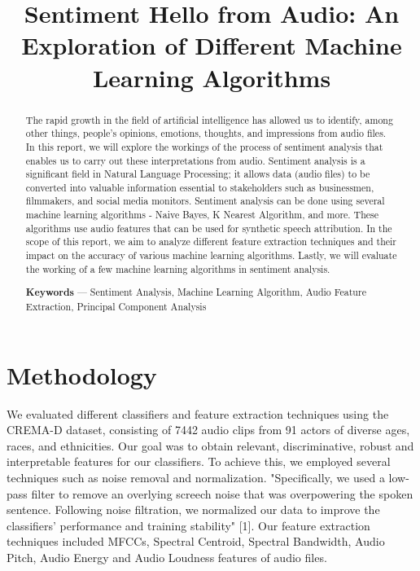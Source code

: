 \documentclass[conference]{IEEEtran}
\begin{document}
\title{Sentiment Hello from Audio: An Exploration of Different Machine Learning Algorithms}
\author{
}
\maketitle

\begin{abstract}
The rapid growth in the field of artificial intelligence has allowed us to identify, among other things, people’s opinions, emotions, thoughts, and impressions from audio files. In this report, we will explore the workings of the process of sentiment analysis that enables us to carry out these interpretations from audio. Sentiment analysis is a significant field in Natural Language Processing; it allows data (audio files) to be converted into valuable information essential to stakeholders such as businessmen, filmmakers, and social media monitors. Sentiment analysis can be done using several machine learning algorithms - Naive Bayes, K Nearest Algorithm, and more. These algorithms use audio features that can be used for synthetic speech attribution. In the scope of this report, we aim to analyze different feature extraction techniques and their impact on the accuracy of various machine learning algorithms. Lastly, we will evaluate the working of a few machine learning algorithms in sentiment analysis.

\textbf{Keywords} — Sentiment Analysis, Machine Learning Algorithm, Audio Feature Extraction, Principal Component Analysis
\end{abstract}

\section{Methodology}
We evaluated different classifiers and feature extraction techniques using the CREMA-D dataset, consisting of 7442 audio clips from 91 actors of diverse ages, races, and ethnicities. Our goal was to obtain relevant, discriminative, robust and interpretable features for our classifiers. To achieve this, we employed several techniques such as noise removal and normalization. "Specifically, we used a low-pass filter to remove an overlying screech noise that was overpowering the spoken sentence. Following noise filtration, we normalized our data to improve the classifiers’ performance and training stability" [1]. Our feature extraction techniques included MFCCs, Spectral Centroid, Spectral Bandwidth, Audio Pitch, Audio Energy and Audio Loudness features of audio files.
\end{document}
